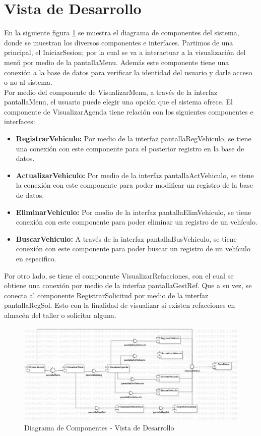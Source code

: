 \section{Vista de Desarrollo}
En la siguiente figura \ref{fig:Diagrama de Componentes - Vista de Desarrollo} se muestra el diagrama de componentes del sistema, donde se muestran los diversos componentes e interfaces. Partimos de una principal, el IniciarSesion; por la cual se va a interactuar a la visualización del menú por medio de la pantallaMenu. Además este componente tiene una conexión a la base de datos para verificar la identidad del usuario y darle acceso o no al sistema. 
\\
Por medio del componente de VisualizarMenu, a través de la interfaz pantallaMenu, el usuario puede elegir una opción que el sistema ofrece. El componente de VisualizarAgenda tiene relación con los siguientes componentes e interfaces: 
\begin{itemize}
	\item \textbf{RegistrarVehiculo:} Por medio de la interfaz pantallaRegVehiculo, se tiene una conexión con este componente para el posterior registro en la base de datos.
	\item \textbf{ActualizarVehiculo:} Por medio de la interfaz pantallaActVehiculo, se tiene la conexión con este componente para poder modificar un registro de la base de datos.
	\item \textbf{EliminarVehiculo:} Por medio de la interfaz pantallaElimVehiculo, se tiene conexión con este componente para poder eliminar un registro de un vehículo.
	\item \textbf{BuscarVehiculo:} A través de la interfaz pantallaBusVehiculo, se tiene conexión con este componente para poder buscar un registro de un vehículo en especifico. 
\end{itemize}
Por otro lado, se tiene el componente VisualizarRefacciones, con el cual se obtiene una conexión por medio de la interfaz pantallaGestRef. Que a su vez, se conecta al componente RegistrarSolicitud por medio de la interfaz pantallaRegSol. Esto con la finalidad de visualizar si existen refacciones en almacén del taller o solicitar alguna. 
\begin{figure}[!h]
	\centering
	\includegraphics[width=1.3\textwidth]{./diseno/vdesarrollo/imagenes/vistaDesarrollo}
	\caption{Diagrama de Componentes - Vista de Desarrollo}
	\label{fig:Diagrama de Componentes - Vista de Desarrollo}
\end{figure}
\clearpage